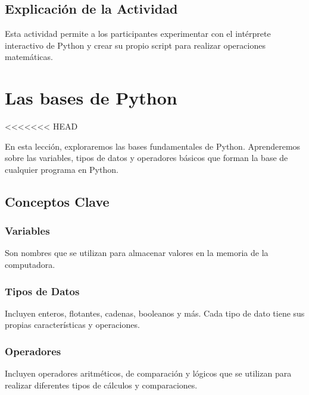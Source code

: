 \documentclass[
  a4paper,
  DIV=11,
  numbers=noendperiod,
  onepage,
  openany]{scrreprt}
\begin{document}
\hypertarget{explicaciuxf3n-de-la-actividad-3}{%
\section{Explicación de la
Actividad}\label{explicaciuxf3n-de-la-actividad-3}}

Esta actividad permite a los participantes experimentar con el
intérprete interactivo de Python y crear su propio script para realizar
operaciones matemáticas.

\hypertarget{las-bases-de-python}{%
\chapter{Las bases de Python}\label{las-bases-de-python}}

\textless\textless\textless\textless\textless\textless\textless{} HEAD

En esta lección, exploraremos las bases fundamentales de Python.
Aprenderemos sobre las variables, tipos de datos y operadores básicos
que forman la base de cualquier programa en Python.

\hypertarget{conceptos-clave-4}{%
\section{Conceptos Clave}\label{conceptos-clave-4}}

\hypertarget{variables}{%
\subsection{Variables}\label{variables}}

Son nombres que se utilizan para almacenar valores en la memoria de la
computadora.

\hypertarget{tipos-de-datos}{%
\subsection{Tipos de Datos}\label{tipos-de-datos}}

Incluyen enteros, flotantes, cadenas, booleanos y más. Cada tipo de dato
tiene sus propias características y operaciones.

\hypertarget{operadores}{%
\subsection{Operadores}\label{operadores}}

Incluyen operadores aritméticos, de comparación y lógicos que se
utilizan para realizar diferentes tipos de cálculos y comparaciones.
\end{document}
